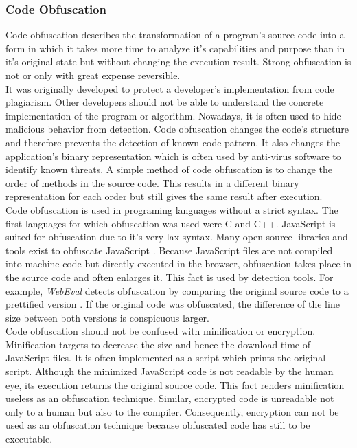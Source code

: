		\subsubsection{Code Obfuscation}
			
			Code obfuscation describes the transformation of a program's source code into a form in which it takes more time to analyze it's capabilities and purpose than in it's original state but without changing the execution result. Strong obfuscation is not or only with great expense reversible. \\
			
			It was originally developed to protect a developer's implementation from code plagiarism. Other developers should not be able to understand the concrete implementation of the program or algorithm. Nowadays, it is often used to hide malicious behavior from detection. Code obfuscation changes the code's structure and therefore prevents the detection of known code pattern. It also changes the application's binary representation which is often used by anti-virus software to identify known threats. A simple method of code obfuscation is to change the order of methods in the source code. This results in a different binary representation for each order but still gives the same result after execution. \\
			
			Code obfuscation is used in programing languages without a strict syntax. The first languages for which obfuscation was used were C and C++. JavaScript is suited for obfuscation due to it's very lax syntax. Many open source libraries and tools exist to obfuscate JavaScript \cite{obfuscationDansTools, obfuscationJavascriptObfuscator, obfuscationJscrambler}. Because JavaScript files are not compiled into machine code but directly executed in the browser, obfuscation takes place in the source code and often enlarges it. This fact is used by detection tools. For example, \textit{WebEval} detects obfuscation by comparing the original source code to a prettified version \cite{190984}. If the original code was obfuscated, the difference of the line size between both versions is conspicuous larger. \\
		
			Code obfuscation should not be confused with minification or encryption. Minification targets to decrease the size and hence the download time of JavaScript files. It is often implemented as a script which prints the original script. Although the minimized JavaScript code is not readable by the human eye, its execution returns the original source code. This fact renders minification useless as an obfuscation technique. Similar, encrypted code is unreadable not only to a human but also to the compiler. Consequently, encryption can not be used as an obfuscation technique because obfuscated code has still to be executable. \\
	
